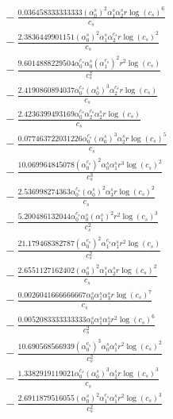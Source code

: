 \documentclass[10pt]{article}
\begin{document}
\begin{align*}
&{}  - \frac{0.036458333333333 \left(\alpha_{0}^s\right)^{2} \alpha_{1}^s \alpha_{2}^s r \log{\left(c_{s} \right)}^{6}}{c_{s}} \\
&{}  - \frac{2.3836449901151 \left(\alpha_{0}^s\right)^{2} \alpha_{1}^s \alpha_{2}^{c_s} r \log{\left(c_{s} \right)}^{2}}{c_{s}} \\
&{}  - \frac{9.6014888229504 \alpha_{0}^{c_s} \alpha_{0}^s \left(\alpha_{1}^{c_s}\right)^{2} r^{2} \log{\left(c_{s} \right)}}{c_{s}^{2}} \\
&{}  - \frac{2.4190860894037 \alpha_{0}^{c_s} \left(\alpha_{0}^s\right)^{3} \alpha_{2}^{c_s} r \log{\left(c_{s} \right)}}{c_{s}} \\
&{}  - \frac{2.4236399493169 \alpha_{0}^{c_s} \alpha_{2}^{c_s} \alpha_{2}^s r \log{\left(c_{s} \right)}}{c_{s}} \\
&{}  - \frac{0.077463722031226 \alpha_{0}^{c_s} \left(\alpha_{0}^s\right)^{3} \alpha_{2}^s r \log{\left(c_{s} \right)}^{5}}{c_{s}} \\
&{}  - \frac{10.069964845078 \left(\alpha_{0}^{c_s}\right)^{2} \alpha_{0}^s \alpha_{1}^s r^{3} \log{\left(c_{s} \right)}^{2}}{c_{s}^{3}} \\
&{}  - \frac{2.536998274363 \alpha_{0}^{c_s} \left(\alpha_{0}^s\right)^{2} \alpha_{3}^s r \log{\left(c_{s} \right)}^{2}}{c_{s}} \\
&{}  - \frac{5.200486132044 \alpha_{0}^{c_s} \alpha_{0}^s \left(\alpha_{1}^s\right)^{2} r^{2} \log{\left(c_{s} \right)}^{3}}{c_{s}^{2}} \\
&{}  - \frac{21.179468382787 \left(\alpha_{0}^{c_s}\right)^{2} \alpha_{1}^{c_s} \alpha_{1}^s r^{2} \log{\left(c_{s} \right)}}{c_{s}^{2}} \\
&{}  - \frac{2.6551127162402 \left(\alpha_{0}^s\right)^{2} \alpha_{1}^s \alpha_{2}^s r \log{\left(c_{s} \right)}^{2}}{c_{s}} \\
&{}  - \frac{0.0026041666666667 \alpha_{0}^s \alpha_{1}^s \alpha_{3}^s r \log{\left(c_{s} \right)}^{7}}{c_{s}} \\
&{}  - \frac{0.0052083333333333 \alpha_{0}^s \alpha_{1}^s \alpha_{2}^s r^{2} \log{\left(c_{s} \right)}^{6}}{c_{s}^{2}} \\
&{}  - \frac{10.690568566939 \left(\alpha_{0}^{c_s}\right)^{3} \alpha_{0}^s \alpha_{1}^s r^{2} \log{\left(c_{s} \right)}^{2}}{c_{s}^{2}} \\
&{}  - \frac{1.3382919119021 \alpha_{0}^{c_s} \left(\alpha_{0}^s\right)^{3} \alpha_{2}^s r \log{\left(c_{s} \right)}^{3}}{c_{s}} \\
&{}  - \frac{2.6911879516055 \left(\alpha_{0}^s\right)^{2} \alpha_{1}^{c_s} \alpha_{1}^s r^{2} \log{\left(c_{s} \right)}^{3}}{c_{s}^{2}} \\

\end{align*}
\end{document}
